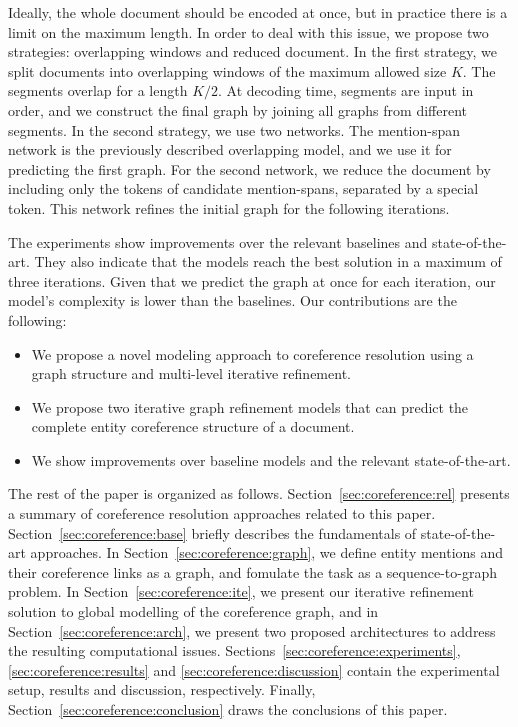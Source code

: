 \documentclass[11pt]{article}
\begin{document}
Ideally, the whole document should be encoded at once, but in practice there is a limit on the maximum length. In order to deal with this issue, we propose two strategies: overlapping windows and reduced document. In the first strategy, we split documents into overlapping windows of the maximum allowed size $K$. The segments overlap for a length $K/2$. At decoding time, segments are input in order, and we construct the final graph by joining all graphs from different segments. In the second strategy, we use two networks. The mention-span network is the previously described overlapping model, and we use it for predicting the first graph. For the second network, we reduce the document by including only the tokens of candidate mention-spans, separated by a special token. This network refines the initial graph for the following iterations. 

The experiments show improvements over the relevant baselines and state-of-the-art.  They also indicate that the models reach the best solution in a maximum of three iterations.  Given that we predict the graph at once for each iteration, our model's complexity is lower than the baselines. 
Our contributions are the following:
\begin{itemize}
\addtolength{\itemsep}{-0.5ex}
	\item We propose a novel modeling approach to coreference resolution using a graph structure and multi-level iterative refinement.
	\item We propose two iterative graph refinement models that can predict the complete entity coreference structure of a document. 
	\item We show improvements over baseline models and the relevant state-of-the-art.
\end{itemize}


The rest of the paper is organized as follows. Section~\ref{sec:coreference:rel} presents a summary of coreference resolution approaches related to this paper.
Section~\ref{sec:coreference:base} briefly describes the fundamentals of state-of-the-art approaches. In Section~\ref{sec:coreference:graph}, we define entity mentions and their coreference links as a graph, and fomulate the task as a sequence-to-graph problem. In Section~\ref{sec:coreference:ite}, we present our iterative refinement solution to global modelling of the coreference graph, and in Section~\ref{sec:coreference:arch}, we present two proposed architectures to address the resulting computational issues. Sections~\ref{sec:coreference:experiments}, \ref{sec:coreference:results} and \ref{sec:coreference:discussion} contain the experimental setup, results and discussion, respectively. Finally, Section~\ref{sec:coreference:conclusion} draws the conclusions of this paper.
\end{document}
